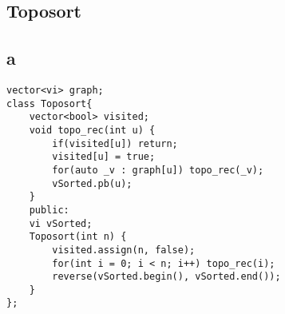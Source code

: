 \documentclass[a4paper]{article}
\begin{document}
\subsection*{Toposort}
\subsection*{a}
\begin{multicols}{2}
\begin{verbatim}
vector<vi> graph;
class Toposort{
    vector<bool> visited;
    void topo_rec(int u) {
        if(visited[u]) return;
        visited[u] = true;
        for(auto _v : graph[u]) topo_rec(_v);
        vSorted.pb(u);
    }
    public:
    vi vSorted;
    Toposort(int n) {
        visited.assign(n, false);
        for(int i = 0; i < n; i++) topo_rec(i);
        reverse(vSorted.begin(), vSorted.end());
    }
};
\end{verbatim}
\end{multicols}
\end{document}
